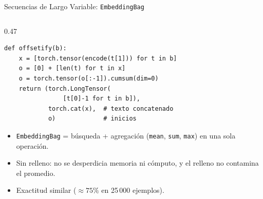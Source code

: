 \documentclass[aspectratio=169, 10pt]{beamer}
\begin{document}
\begin{frame}[fragile]{Secuencias de Largo Variable: \texttt{EmbeddingBag}}
\begin{columns}[T]
		\begin{column}{0.47\textwidth}
			\begin{tcolorbox}[codebox]
\scriptsize
\begin{verbatim}
def offsetify(b):
    x = [torch.tensor(encode(t[1])) for t in b]
    o = [0] + [len(t) for t in x]
    o = torch.tensor(o[:-1]).cumsum(dim=0)
    return (torch.LongTensor(
                [t[0]-1 for t in b]),
            torch.cat(x),  # texto concatenado
            o)             # inicios
\end{verbatim}
			\end{tcolorbox}

			\begin{itemize}
				\small
				\item \texttt{EmbeddingBag} = b\'usqueda + agregaci\'on (\texttt{mean}, \texttt{sum}, \texttt{max}) en una sola operaci\'on.
				\item Sin relleno: no se desperdicia memoria ni c\'omputo, y el relleno no contamina el promedio.
				\item Exactitud similar ($\approx 75\%$ en 25\,000 ejemplos).
			\end{itemize}
		\end{column}
	\end{columns}

\end{frame}
\end{document}
